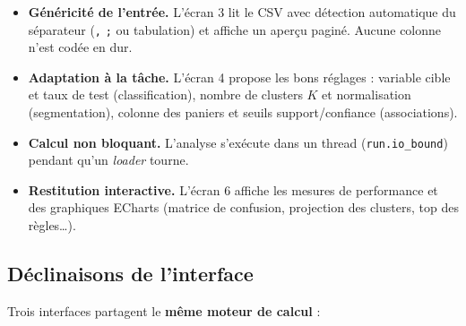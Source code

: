 \documentclass[11pt,a4paper]{article}
\begin{document}
\begin{center}
\end{center}

\begin{itemize}[leftmargin=*]
  \item \textbf{Généricité de l'entrée.} L'écran 3 lit le CSV avec détection
        automatique du séparateur (\texttt{,} \texttt{;} ou tabulation) et affiche
        un aperçu paginé. Aucune colonne n'est codée en dur.
  \item \textbf{Adaptation à la tâche.} L'écran 4 propose les bons réglages :
        variable cible et taux de test (classification), nombre de clusters $K$ et
        normalisation (segmentation), colonne des paniers et seuils
        support/confiance (associations).
  \item \textbf{Calcul non bloquant.} L'analyse s'exécute dans un thread
        (\texttt{run.io\_bound}) pendant qu'un \emph{loader} tourne.
  \item \textbf{Restitution interactive.} L'écran 6 affiche les mesures de
        performance et des graphiques ECharts (matrice de confusion, projection
        des clusters, top des règles\ldots).
\end{itemize}

\subsection{Déclinaisons de l'interface}

Trois interfaces partagent le \textbf{même moteur de calcul} :
\end{document}
